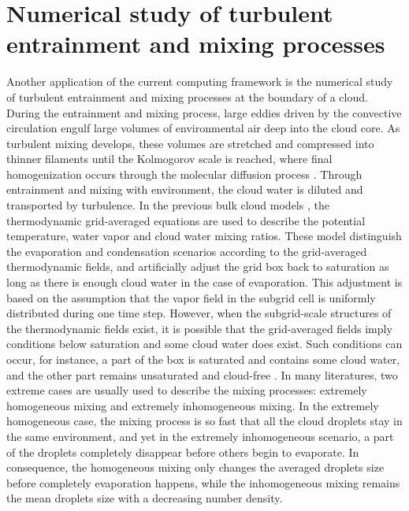\section{Numerical study of turbulent entrainment and mixing processes}
Another application of the current computing framework is the numerical study 
of turbulent entrainment and mixing processes at the boundary of a cloud. During the entrainment and mixing process, large eddies driven by the convective circulation engulf large volumes of environmental air deep into the cloud core. As turbulent mixing develops, these volumes are stretched and compressed into thinner filaments until the Kolmogorov scale is reached, where final homogenization occurs through the molecular diffusion process \cite{Burnet2007Observational}. Through entrainment and mixing with environment, the cloud water is diluted and transported by turbulence. In the previous bulk cloud models \cite{Grabowski1990}, the thermodynamic grid-averaged equations are used to describe the potential temperature, water vapor and cloud water mixing ratios. These model distinguish the evaporation and condensation scenarios according to the grid-averaged thermodynamic fields, and artificially adjust the grid box back to saturation as long as there is enough cloud water in the case of evaporation. This adjustment is based on the assumption that the vapor field in the subgrid cell is uniformly distributed during one time step. However, when the subgrid-scale structures of the thermodynamic fields exist, it is possible that the grid-averaged fields imply conditions below saturation and some cloud water does exist. Such conditions can occur, for instance, a part of the box is saturated and contains some cloud water, and the other part remains unsaturated and cloud-free \cite{Grabowski2007}. In many literatures\cite{Baker1980, Burnet2007, Lehmann2009}, two extreme cases are usually used to describe the mixing processes: extremely homogeneous mixing and extremely inhomogeneous mixing. In the extremely homogeneous case, the mixing process is so fast that all the cloud droplets stay in the same environment, and yet in the extremely inhomogeneous scenario, a part of the droplets completely disappear before others begin to evaporate. In consequence, the homogeneous mixing only changes the averaged droplets size before completely evaporation happens, while the inhomogeneous mixing remains the mean droplets size with a decreasing number density.

